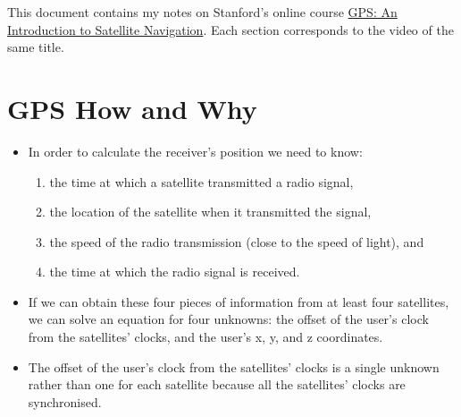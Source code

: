\documentclass{article}
\begin{document}
This document contains my notes on Stanford's online course \href{https://www.youtube.com/playlist?list=PLGvhNIiu1ubyEOJga50LJMzVXtbUq6CPo}{GPS: An Introduction to Satellite Navigation}. Each section corresponds to the video of the same title.

\tableofcontents

\section{GPS How and Why}

\begin{itemize}
  \item In order to calculate the receiver's position we need to know:

        \begin{enumerate}
          \item the time at which a satellite transmitted a radio signal,

          \item the location of the satellite when it transmitted the signal,

          \item the speed of the radio transmission (close to the speed of light), and

          \item the time at which the radio signal is received.
        \end{enumerate}

  \item If we can obtain these four pieces of information from at least four satellites, we can solve an equation for four unknowns: the offset of the user's clock from the satellites' clocks, and the user's x, y, and z coordinates.

  \item The offset of the user's clock from the satellites' clocks is a single unknown rather than one for each satellite because all the satellites' clocks are synchronised.
\end{itemize}
\end{document}

